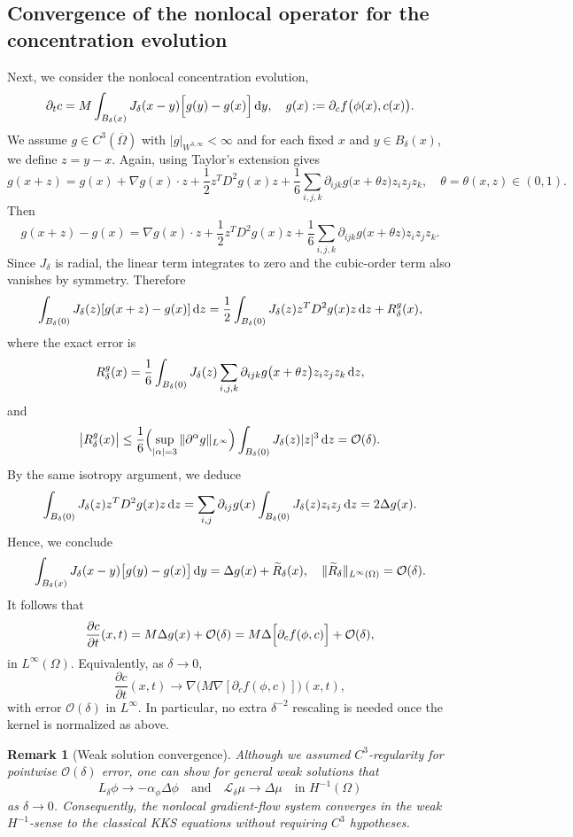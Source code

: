\documentclass[]{article}
\newtheorem{remark}{Remark}[section]
\newcommand{\dz}{\,\textup{d}z}
\newcommand{\dy}{\,\textup{d}y}
\begin{document}
\subsection{Convergence of the nonlocal operator for the concentration evolution}
\label{sec:convergence_nonlocal_concentration}

Next, we consider the nonlocal concentration evolution,
\[
\partial_t c
= M \int_{B_{\delta}(x)} J_{\delta}(x-y)\Bigl[
g(y) - g(x)\Bigr]\dy,
\quad
g(x) := \partial_c f\bigl(\phi(x),c(x)\bigr).
\]
We assume $g\in C^3(\overline{\Omega})$ with $|g|_{W^{3,\infty}}<\infty$ and
for each fixed $x$ and $y\in B_{\delta}(x)$, we define $z=y-x$. Again, using Taylor's extension gives
\[
g(x+z)
= g(x)
+ \nabla g(x)\cdot z
+ \frac12z^TD^2 g(x)z
+ \frac{1}{6}\sum_{i,j,k} \partial_{i j k}g\bigl(x+\theta z\bigr)z_iz_jz_k, \quad \theta=\theta(x,z)\in(0,1).
\]
Then
\[
g(x+z)-g(x)
= \nabla g(x)\cdot z
+ \frac12z^TD^2 g(x)z
+ \frac{1}{6}\sum_{i,j,k} \partial_{i j k}g\bigl(x+\theta z\bigr)z_iz_jz_k.
\]
Since $J_{\delta}$ is radial, the linear term integrates to zero and the cubic-order term also vanishes by symmetry.  Therefore
\[
\int_{B_{\delta}(0)} J_{\delta}(z)[g(x+z)-g(x)]\dz
= \frac12 \int_{B_{\delta}(0)} J_{\delta}(z)z^TD^2 g(x)z \dz
+ R_{\delta}^g(x),
\]
where the exact error is
\[
R_{\delta}^g(x)
= \frac{1}{6}\int_{B_{\delta}(0)}J_{\delta}(z)
\sum_{i,j,k}\partial_{i j k}g\bigl(x+\theta z\bigr)z_iz_jz_k \dz,
\]
and
\[
\bigl|R_{\delta}^g(x)\bigr|
\le \frac{1}{6}\Bigl(\sup_{|\alpha|=3}\|\partial^{\alpha}g\|_{L^{\infty}}\Bigr)
\int_{B_{\delta}(0)}J_{\delta}(z)\lvert z\rvert^3\dz
= \mathcal{O}(\delta).
\]
By the same isotropy argument, we deduce
\[
\int_{B_{\delta}(0)} J_{\delta}(z)z^TD^2 g(x)z \dz
= \sum_{i,j} \partial_{i j} g(x)\int_{B_{\delta}(0)}J_{\delta}(z)z_iz_j\dz
= 2\Delta g(x).
\]
Hence, we conclude
\[
\int_{B_{\delta}(x)} J_{\delta}(x-y)\bigl[g(y)-g(x)\bigr]\dy
= \Delta g(x) + \widetilde R_{\delta}(x),
\quad
\|\widetilde R_{\delta}\|_{L^{\infty}(\Omega)} = \mathcal{O}(\delta).
\]
It follows that
\[
\frac{\partial c}{\partial t}(x,t)
= M\Delta g(x) + \mathcal{O}(\delta)
=
M\Delta\Bigl[\partial_c f(\phi,c)\Bigr] + \mathcal{O}(\delta),
\]
in $L^\infty(\Omega)$. 
%
%
Equivalently, as $\delta\to0$,
\[
\frac{\partial c}{\partial t}(x,t)
\longrightarrow
\nabla\bigl(M\nabla[\partial_c f(\phi,c)]\bigr)(x,t),
\]
with error $\mathcal{O}(\delta)$ in $L^\infty$.  In particular, no extra $\delta^{-2}$ rescaling is needed once the kernel is normalized as above.
%
\begin{remark}[Weak solution convergence]
	Although we assumed $C^3$-regularity for pointwise $\mathcal O(\delta)$ error, one can show for general weak solutions that
	\[
	L_\delta\phi \to -\alpha_\phi\Delta\phi
	\quad\text{and}\quad
	\mathcal{L}_\delta\mu \to \Delta\mu
	\quad\text{in }H^{-1}(\Omega)
	\]
	as \(\delta\to0\).  Consequently, the nonlocal gradient-flow system converges in the weak $H^{-1}$-sense to the classical KKS equations without requiring $C^3$ hypotheses.
\end{remark}
\end{document}
